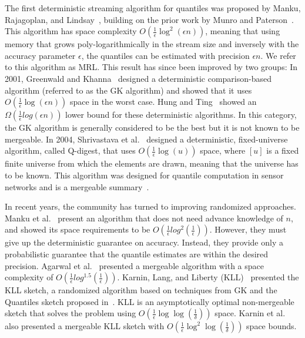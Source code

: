 The first deterministic streaming algorithm for quantiles was proposed by Manku, Rajagoplan, and Lindsay~\cite{MankuRajagoplanLindsay1998}, building on the prior work by Munro and Paterson~\cite{MunroPeterson1980}. This algorithm has space complexity $O(\frac{1}{\epsilon}\log^2(\epsilon n))$, meaning that using memory that grows poly-logarithmically in the stream size and inversely with the accuracy parameter $\epsilon$, the quantiles can be estimated with precision $\epsilon n$. We refer to this algorithm as MRL. This result has since been improved by two groups: 
In 2001, Greenwald and Khanna~\cite{Greenwald2001_online_computation} designed a deterministic comparison-based algorithm (referred to as the GK algorithm) and showed that it uses $O(\frac{1}{\epsilon}\log(\epsilon n))$ space in the worst case. Hung and Ting~\cite{HungTing2010Omega} showed an $\Omega (\frac{1}{\epsilon}log(\epsilon n))$ lower bound for these deterministic algorithms. In this category, the GK algorithm is generally considered to be the best but it is not known to be mergeable.
In 2004, Shrivastava et al.~\cite{Shrivastava2004Qdigest} designed a deterministic, fixed-universe algorithm, called Q-digest, that uses $O(\frac{1}{\epsilon}\log(u))$ space, where $[u]$ is a fixed finite universe from which the elements are drawn, meaning that the universe has to be known. This algorithm was designed for quantile computation in sensor networks and is a mergeable summary~\cite{mergeables_summaries}. %


In recent years, the community has turned to improving randomized approaches. Manku et al.~\cite{MankuRajagoplanLindsay1999} present an algorithm that does not need advance knowledge of $n$, and showed its space requirements to be $O (\frac{1}{\epsilon}log^{2}(\frac{1}{\epsilon}))$. However, they must give up the deterministic guarantee on accuracy. Instead, they provide only a probabilistic guarantee that the quantile estimates are within the desired precision.
Agarwal et al.~\cite{mergeables_summaries} presented a mergeable algorithm with a space complexity of $O (\frac{1}{\epsilon}log^{1.5}(\frac{1}{\epsilon}))$. Karnin, Lang, and Liberty (KLL)~\cite{KarninKevinLiberty2016} presented the KLL sketch, a randomized algorithm based on techniques from GK and the Quantiles sketch proposed in~\cite{mergeables_summaries}. KLL is an asymptotically optimal non-mergeable sketch that solves the problem using $O (\frac{1}{\epsilon}\log \log(\frac{1}{\delta}))$ space. Karnin et al. also presented a mergeable KLL sketch with $O (\frac{1}{\epsilon}\log^2 \log(\frac{1}{\delta}))$ space bounds.



